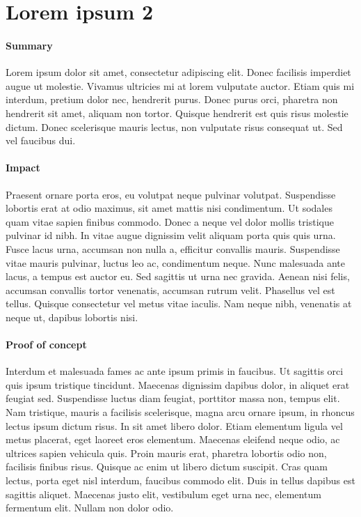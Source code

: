 \section{\makecvssbadge Lorem ipsum 2}

\makecvssbox

\paragraph{Summary} Lorem ipsum dolor sit amet, consectetur adipiscing elit. Donec facilisis imperdiet augue ut molestie. Vivamus ultricies mi at lorem vulputate auctor. Etiam quis mi interdum, pretium dolor nec, hendrerit purus. Donec purus orci, pharetra non hendrerit sit amet, aliquam non tortor. Quisque hendrerit est quis risus molestie dictum. Donec scelerisque mauris lectus, non vulputate risus consequat ut. Sed vel faucibus dui.

\paragraph{Impact}
Praesent ornare porta eros, eu volutpat neque pulvinar volutpat. Suspendisse lobortis erat at odio maximus, sit amet mattis nisi condimentum. Ut sodales quam vitae sapien finibus commodo. Donec a neque vel dolor mollis tristique pulvinar id nibh. In vitae augue dignissim velit aliquam porta quis quis urna. Fusce lacus urna, accumsan non nulla a, efficitur convallis mauris. Suspendisse vitae mauris pulvinar, luctus leo ac, condimentum neque. Nunc malesuada ante lacus, a tempus est auctor eu. Sed sagittis ut urna nec gravida. Aenean nisi felis, accumsan convallis tortor venenatis, accumsan rutrum velit. Phasellus vel est tellus. Quisque consectetur vel metus vitae iaculis. Nam neque nibh, venenatis at neque ut, dapibus lobortis nisi. 

\paragraph{Proof of concept}
Interdum et malesuada fames ac ante ipsum primis in faucibus. Ut sagittis orci quis ipsum tristique tincidunt. Maecenas dignissim dapibus dolor, in aliquet erat feugiat sed. Suspendisse luctus diam feugiat, porttitor massa non, tempus elit. Nam tristique, mauris a facilisis scelerisque, magna arcu ornare ipsum, in rhoncus lectus ipsum dictum risus. In sit amet libero dolor. Etiam elementum ligula vel metus placerat, eget laoreet eros elementum. Maecenas eleifend neque odio, ac ultrices sapien vehicula quis. Proin mauris erat, pharetra lobortis odio non, facilisis finibus risus. Quisque ac enim ut libero dictum suscipit. Cras quam lectus, porta eget nisl interdum, faucibus commodo elit. Duis in tellus dapibus est sagittis aliquet. Maecenas justo elit, vestibulum eget urna nec, elementum fermentum elit. Nullam non dolor odio.

